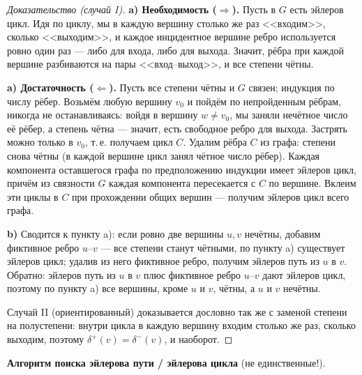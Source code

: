 \begin{proof}[Доказательство (случай I)]
\textbf{a) Необходимость ($\Rightarrow$).} Пусть в $G$ есть эйлеров цикл.
Идя по циклу, мы в каждую вершину столько же раз <<входим>>, сколько
<<выходим>>, и каждое инцидентное вершине ребро используется ровно один
раз --- либо для входа, либо для выхода. Значит, рёбра при каждой вершине
разбиваются на пары <<вход--выход>>, и все степени чётны.

\textbf{a) Достаточность ($\Leftarrow$).} Пусть все степени чётны и $G$
связен; индукция по числу рёбер. Возьмём любую вершину $v_0$ и пойдём по
непройденным рёбрам, никогда не останавливаясь: войдя в вершину
$w \ne v_0$, мы заняли нечётное число её рёбер, а степень чётна --- значит,
есть свободное ребро для выхода. Застрять можно только в $v_0$, т.\,е.
получаем цикл $C$. Удалим рёбра $C$ из графа: степени снова чётны
(в каждой вершине цикл занял чётное число рёбер). Каждая компонента
оставшегося графа по предположению индукции имеет эйлеров цикл, причём
из связности $G$ каждая компонента пересекается с $C$ по вершине.
Вклеим эти циклы в $C$ при прохождении общих вершин --- получим эйлеров
цикл всего графа.

\textbf{b)} Сводится к пункту a): если ровно две вершины $u, v$ нечётны,
добавим фиктивное ребро $u$--$v$ --- все степени станут чётными, по
пункту a) существует эйлеров цикл; удалив из него фиктивное ребро,
получим эйлеров путь из $u$ в $v$. Обратно: эйлеров путь из $u$ в $v$
плюс фиктивное ребро $u$--$v$ дают эйлеров цикл, поэтому по пункту a)
все вершины, кроме $u$ и $v$, чётны, а $u$ и $v$ нечётны.

Случай II (ориентированный) доказывается дословно так же с заменой
степени на полустепени: внутри цикла в каждую вершину входим столько же
раз, сколько выходим, поэтому $\delta^+(v) = \delta^-(v)$, и наоборот.
\end{proof}


\medskip
\textbf{Алгоритм поиска эйлерова пути / эйлерова цикла} (не единственные!).

